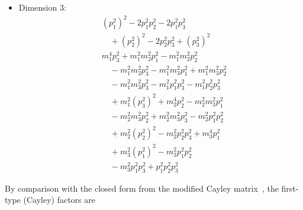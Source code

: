 \documentclass[11pt,a4paper]{article}
\begin{document}
\begin{itemize}
\begin{align*}
&\quad {}- m_{1}^{2} m_{2}^{2} p^{2}_{3} - m_{1}^{2} m_{3}^{2} p^{2}_{1} + m_{1}^{2} m_{3}^{2} p^{2}_{2} \\
&\quad {}- m_{1}^{2} m_{3}^{2} p^{2}_{3} - m_{1}^{2} p^{2}_{1} p^{2}_{3} - m_{1}^{2} p^{2}_{2} p^{2}_{3} \\
&\quad {}+ m_{1}^{2} \left(p^{2}_{3}\right)^{2} + m_{2}^{4} p^{2}_{2} - m_{2}^{2} m_{3}^{2} p^{2}_{1} \\
&\quad {}- m_{2}^{2} m_{3}^{2} p^{2}_{2} + m_{2}^{2} m_{3}^{2} p^{2}_{3} - m_{2}^{2} p^{2}_{1} p^{2}_{2} \\
&\quad {}+ m_{2}^{2} \left(p^{2}_{2}\right)^{2} - m_{2}^{2} p^{2}_{2} p^{2}_{3} + m_{3}^{4} p^{2}_{1} \\
&\quad {}+ m_{3}^{2} \left(p^{2}_{1}\right)^{2} - m_{3}^{2} p^{2}_{1} p^{2}_{2} \\
&\quad {}- m_{3}^{2} p^{2}_{1} p^{2}_{3} + p^{2}_{1} p^{2}_{2} p^{2}_{3}
\end{align*}
\item Dimension 3:
\begin{align*}
&\left(p^{2}_{1}\right)^{2} - 2 p^{2}_{1} p^{2}_{2} - 2 p^{2}_{1} p^{2}_{3} \\
&\quad {}+ \left(p^{2}_{2}\right)^{2} - 2 p^{2}_{2} p^{2}_{3} + \left(p^{2}_{3}\right)^{2} \\
&m_{1}^{4} p^{2}_{3} + m_{1}^{2} m_{2}^{2} p^{2}_{1} - m_{1}^{2} m_{2}^{2} p^{2}_{2} \\
&\quad {}- m_{1}^{2} m_{2}^{2} p^{2}_{3} - m_{1}^{2} m_{3}^{2} p^{2}_{1} + m_{1}^{2} m_{3}^{2} p^{2}_{2} \\
&\quad {}- m_{1}^{2} m_{3}^{2} p^{2}_{3} - m_{1}^{2} p^{2}_{1} p^{2}_{3} - m_{1}^{2} p^{2}_{2} p^{2}_{3} \\
&\quad {}+ m_{1}^{2} \left(p^{2}_{3}\right)^{2} + m_{2}^{4} p^{2}_{2} - m_{2}^{2} m_{3}^{2} p^{2}_{1} \\
&\quad {}- m_{2}^{2} m_{3}^{2} p^{2}_{2} + m_{2}^{2} m_{3}^{2} p^{2}_{3} - m_{2}^{2} p^{2}_{1} p^{2}_{2} \\
&\quad {}+ m_{2}^{2} \left(p^{2}_{2}\right)^{2} - m_{2}^{2} p^{2}_{2} p^{2}_{3} + m_{3}^{4} p^{2}_{1} \\
&\quad {}+ m_{3}^{2} \left(p^{2}_{1}\right)^{2} - m_{3}^{2} p^{2}_{1} p^{2}_{2} \\
&\quad {}- m_{3}^{2} p^{2}_{1} p^{2}_{3} + p^{2}_{1} p^{2}_{2} p^{2}_{3}
\end{align*}
\end{itemize}
By comparison with the closed form from the modified Cayley matrix~\cite{dhpt2023}, the first-type (Cayley) factors are
\end{document}
